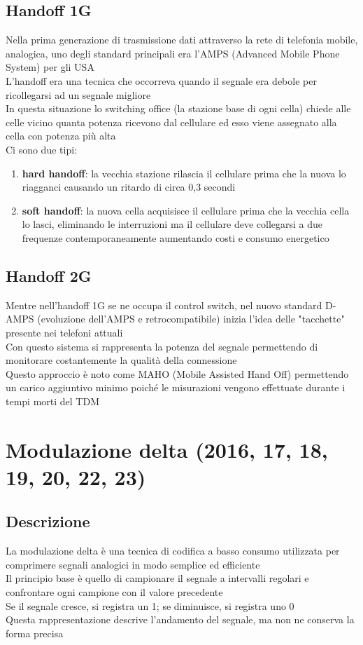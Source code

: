\documentclass[10pt,oneside,a4paper]{article}
\begin{document}
\subsection{Handoff 1G}
Nella prima generazione di trasmissione dati attraverso la rete di telefonia mobile, analogica, uno degli standard principali era l'AMPS (Advanced Mobile Phone System) per gli USA\\
L'handoff era una tecnica che occorreva quando il segnale era debole per ricollegarsi ad un segnale migliore\\
In questa situazione lo switching office (la stazione base di ogni cella) chiede alle celle vicino quanta potenza ricevono dal cellulare ed esso viene assegnato alla cella con potenza più alta\\
Ci sono due tipi:
\begin{enumerate}
\item \textbf{hard handoff}: la vecchia stazione rilascia il cellulare prima che la nuova lo riagganci causando un ritardo di circa 0,3 secondi
\item \textbf{soft handoff}: la nuova cella acquisisce il cellulare prima che la vecchia cella lo lasci, eliminando le interruzioni ma il cellulare deve collegarsi a due frequenze contemporaneamente aumentando costi e consumo energetico
\end{enumerate}
\subsection{Handoff 2G}
Mentre nell'handoff 1G se ne occupa il control switch, nel nuovo standard D-AMPS (evoluzione dell'AMPS e retrocompatibile) inizia l'idea delle "tacchette" presente nei telefoni attuali\\
Con questo sistema si rappresenta la potenza del segnale permettendo di monitorare costantemente la qualità della connessione\\
Questo approccio è noto come MAHO (Mobile Assisted Hand Off) permettendo un carico aggiuntivo minimo poiché le misurazioni vengono effettuate durante i tempi morti del TDM\\
\section{Modulazione delta (2016, 17, 18, 19, 20, 22, 23)}
\subsection{Descrizione}
La modulazione delta è una tecnica di codifica a basso consumo utilizzata per comprimere segnali analogici in modo semplice ed efficiente\\
Il principio base è quello di campionare il segnale a intervalli regolari e confrontare ogni campione con il valore precedente\\ Se il segnale cresce, si registra un 1; se diminuisce, si registra uno 0\\
Questa rappresentazione descrive l'andamento del segnale, ma non ne conserva la forma precisa
\end{document}
